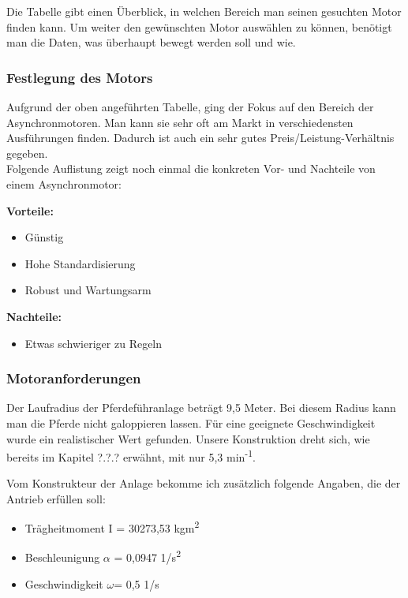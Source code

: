 Die Tabelle gibt einen Überblick, in welchen Bereich man seinen gesuchten Motor finden kann. 
Um weiter den gewünschten Motor auswählen zu können, benötigt man die Daten, was überhaupt bewegt werden soll und wie. 

\subsubsection{Festlegung des Motors}
\label{sec:festlegungDesMotors}

Aufgrund der oben angeführten Tabelle, ging der Fokus auf den Bereich der Asynchronmotoren. Man kann sie sehr oft am Markt in verschiedensten Ausführungen finden. Dadurch ist auch ein sehr gutes Preis/Leistung-Verhältnis gegeben. 
\\
Folgende Auflistung zeigt noch einmal die konkreten Vor- und Nachteile von einem Asynchronmotor:


\textbf{Vorteile:}

\begin{itemize}
	\item{Günstig}
	\item{Hohe Standardisierung}
	\item{Robust und Wartungsarm}
\end{itemize}

\textbf{Nachteile:}

\begin{itemize}
	\item{Etwas schwieriger zu Regeln}
\end{itemize}

\subsubsection{Motoranforderungen}
\label{sec:motoranforderungen}

Der Laufradius der Pferdeführanlage beträgt 9,5 Meter. Bei diesem Radius kann man die Pferde nicht galoppieren lassen. 
Für eine geeignete Geschwindigkeit wurde ein realistischer Wert gefunden. %
Unsere Konstruktion dreht sich, wie bereits im Kapitel ?.?.? erwähnt, mit nur 5,3 min\textsuperscript{-1}. 

Vom Konstrukteur der Anlage bekomme ich zusätzlich folgende Angaben, die der Antrieb erfüllen soll:
\\

\begin{itemize}
	\item{Trägheitmoment I = 30273,53 kgm\textsuperscript{2}}
	\item{Beschleunigung $\alpha$ = 0,0947 1/s\textsuperscript{2}}
	\item{Geschwindigkeit $\omega$= 0,5 1/s}
\end{itemize}

